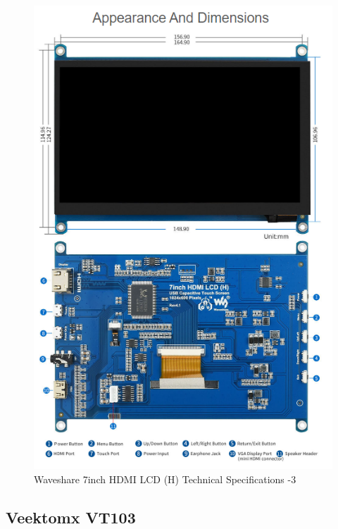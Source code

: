 \begin{figure}[H]
    \centering
    \includegraphics[width=0.85\linewidth]{texs/appendix/data/techspecs/screen3.png}
    \caption{Waveshare 7inch HDMI LCD (H) Technical Specifications -3 }
    \label{fig:lcd-3}
\end{figure}

\subsection{Veektomx VT103}

